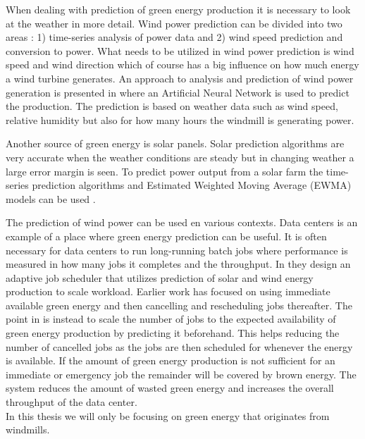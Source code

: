 When dealing with prediction of green energy production it is necessary to look at the weather in more detail. Wind power prediction can be divided into two areas \cite{5}: 1) time-series analysis of power data and 2) wind speed prediction and conversion to power. What needs to be utilized in wind power prediction is wind speed and wind direction which of course has a big influence on how much energy a wind turbine generates. An approach to analysis and prediction of wind power generation is presented in \cite{WindPowerGenerationUsingANN} where an Artificial Neural Network is used to predict the production. The prediction is based on weather data such as wind speed, relative humidity but also for how many hours the windmill is generating power.

Another source of green energy is solar panels. Solar
prediction algorithms are very accurate when the weather conditions are steady but in changing weather a large error margin is seen. To predict power output from a solar farm the time-series prediction algorithms and Estimated Weighted Moving Average (EWMA) models can be used \cite{5}.

The prediction of wind power can be used en various contexts. Data centers is an example of a place where green energy prediction can be useful. It is often necessary for data centers to run long-running batch jobs where performance is measured in how many jobs it completes and the throughput. In \cite{5} they design an adaptive job scheduler that utilizes prediction of solar and wind energy production to scale workload. Earlier work has focused on using immediate available green energy and then cancelling and rescheduling jobs thereafter. The point in \cite{5} is instead to scale the number of jobs to the expected availability of green energy production by predicting it beforehand. This helps reducing the number of cancelled jobs as the jobs are then scheduled for whenever the energy is available. If the amount of green energy production is not sufficient for an immediate or emergency job the remainder will be covered by brown energy. The system reduces the amount of wasted green energy and increases the overall throughput of the data center.
\\[0.5cm]
In this thesis we will only be focusing on green energy that originates from windmills.